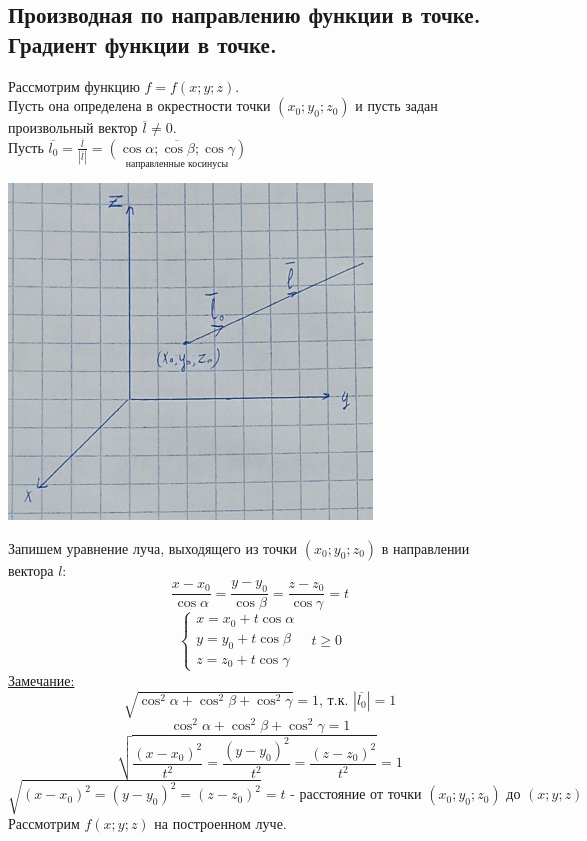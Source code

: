 \documentclass[12pt]{article}
\begin{document}
    \subsection{Производная по направлению функции в точке. Градиент функции в точке.}\noindent
    Рассмотрим функцию $f = f(x; y; z)$.\\
    Пусть она определена в окрестности точки $(x_0; y_0; z_0)$ и пусть задан произвольный вектор $\overline{l} \ne 0$.\\
    Пусть $\overline{l_0} = \frac{\overline{l}}{|\overline{l}|} = \underset{\text{направленные косинусы}}{\left( \overline{\cos \alpha; \cos \beta; \cos \gamma} \right)}$
    \begin{center}
        \includegraphics{7.10.1.png}
    \end{center}
    Запишем уравнение луча, выходящего из точки $(x_0; y_0; z_0)$ в направлении вектора $l$:
    \[ \frac{x - x_0}{\cos \alpha} = \frac{y - y_0}{\cos \beta} = \frac{z - z_0}{\cos \gamma} = t \]
    \[ \begin{cases}
        x = x_0 + t\cos \alpha\\
        y = y_0 + t\cos \beta\\
        z = z_0 + t\cos \gamma
    \end{cases}\,\,\,\,\, t \ge 0 \]
    \underline{Замечание:}
    \[ \sqrt{\cos^2 \alpha + \cos^2 \beta + \cos^2 \gamma} = 1\text{, т.к. } |\overline{l_0}| = 1 \]
    \[ \cos^2 \alpha + \cos^2 \beta + \cos^2 \gamma = 1\]
    \[ \sqrt{\frac{(x - x_0)^2}{t^2} = \frac{(y - y_0)^2}{t^2} = \frac{(z - z_0)^2}{t^2}} = 1 \]
    \[ \sqrt{(x - x_0)^2 = (y - y_0)^2 = (z - z_0)^2} = t\text{ - расстояние от точки } (x_0; y_0; z_0) \text{ до } (x; y; z) \]
    Рассмотрим $f(x;y;z)$ на построенном луче.\\
\end{document}
